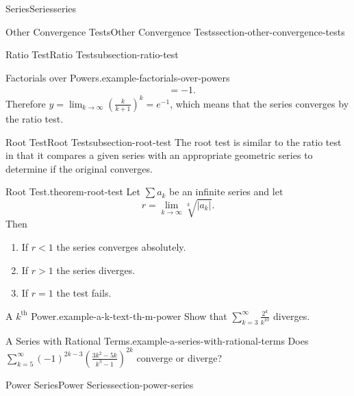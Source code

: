 \documentclass[oneside,10pt,]{book}
\numberwithin{equation}{section}
\newcommand{\lt}{<}
\newcommand{\gt}{>}
\newcommand{\amp}{&}
\begin{document}
\begin{chapterptx}{Series}{}{Series}{}{}{series}
\begin{sectionptx}{Other Convergence Tests}{}{Other Convergence Tests}{}{}{section-other-convergence-tests}
\begin{subsectionptx}{Ratio Test}{}{Ratio Test}{}{}{subsection-ratio-test}
\begin{example}{Factorials over Powers.}{example-factorials-over-powers}
\begin{align*}
\amp = -1 \text{.}
\end{align*}
Therefore \(y = \lim_{k\to\infty}\left(\frac{k}{k+1}\right)^{k} = e^{-1}\), which means that the series converges by the ratio test.%
\end{example}
\end{subsectionptx}
%
%
\typeout{************************************************}
\typeout{************************************************}
%
\begin{subsectionptx}{Root Test}{}{Root Test}{}{}{subsection-root-test}
\hypertarget{p-923}{}%
The root test is similar to the ratio test in that it compares a given series with an appropriate geometric series to determine if the original converges.%
\begin{theorem}{Root Test.}{}{theorem-root-test}%
\hypertarget{p-924}{}%
Let \(\sum a_{k}\) be an infinite series and let%
\begin{equation*}
r = \lim_{k\to\infty}\sqrt[k]{|a_{k}|}\text{.}
\end{equation*}
Then\leavevmode%
\begin{enumerate}
\item\hypertarget{li-104}{}\hypertarget{p-925}{}%
If \(r \lt 1\) the series converges absolutely.%
\item\hypertarget{li-105}{}\hypertarget{p-926}{}%
If \(r \gt 1\) the series diverges.%
\item\hypertarget{li-106}{}\hypertarget{p-927}{}%
If \(r = 1\) the test fails.%
\end{enumerate}
%
\end{theorem}
\begin{example}{A \(k^{\text{th}}\) Power.}{example-a-k-text-th-m-power}%
\hypertarget{p-928}{}%
Show that \(\sum_{k=3}^{\infty}\frac{2^{k}}{k^{10}}\) diverges.%
\end{example}
\begin{example}{A Series with Rational Terms.}{example-a-series-with-rational-terms}%
\hypertarget{p-929}{}%
Does \(\sum_{k=5}^{\infty}(-1)^{2k - 3}\left(\frac{3k^{2} - 5k}{k^{3} - 1}\right)^{2k}\) converge or diverge?%
\end{example}
\end{subsectionptx}
\end{sectionptx}
%
%
\typeout{************************************************}
\typeout{************************************************}
%
\begin{sectionptx}{Power Series}{}{Power Series}{}{}{section-power-series}

\end{sectionptx}
\end{chapterptx}
\end{document}
